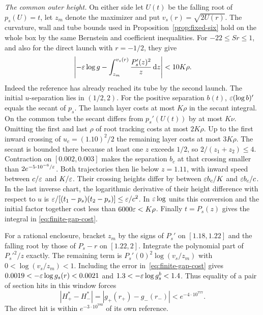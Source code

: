\emph{The common outer height.}
On either side let $U(t)$ be the falling root of $p_s(U)=t$, let
$z_m$ denote the maximizer and put $v_s(r)=\sqrt{2U(r)}$.
The curvature, wall and tube bounds used in
Proposition~\ref{prop:fixed-six} hold on the whole box by the same
Bernstein and coefficient inequalities. For $-22\le Sr\le1$,
and also for the direct launch with $r=-1/2$, they give
\begin{equation}\label{eq:finite-gap-cost}
 \left|-\varepsilon\log g-
   \int_{z_m}^{v_s(r)}\frac{P_s'(z)^2}{z}\,\mathrm{d} z\right|<10K\rho .
\end{equation}
Indeed the reference has already reached its tube by the second launch.
The initial $u$-separation lies in $(1/2,2)$. For the positive
separation $b(t)$, $\varepsilon(\log b)'$ equals the secant of $p_s$.
The launch layer costs at most $K\rho$ in the secant integral.
On the common tube the secant differs from $p_s'(U(t))$ by at most
$K\nu$. Omitting the first and last $\rho$ of root tracking costs at most
$2K\rho$. Up to the first inward crossing of $u_c=(1.10)^2/2$ the
remaining layer costs at most $3K\rho$. The secant is bounded there
because at least one $z$ exceeds $1/2$, so $2/(z_1+z_2)\le4$.
Contraction on $[0.002,0.003]$ makes the separation $b_c$ at that
crossing smaller than $2e^{-5\cdot10^{-6}/\varepsilon}$. Both trajectories
then lie below $z=1.11$, with inward speed between $c/\varepsilon$ and
$K/\varepsilon$. Their crossing heights differ by between
$\varepsilon b_c/K$ and $\varepsilon b_c/c$. In the last inverse chart,
the logarithmic derivative of their height difference with respect to $u$
is $\varepsilon/[(t_1-p_s)(t_2-p_s)]\le\varepsilon/c^2$. In $\varepsilon\log$
units this conversion and the initial factor together cost less than
$6000\varepsilon<K\rho$. Finally $t=P_s(z)$ gives the integral in
\eqref{eq:finite-gap-cost}.

For a rational enclosure, bracket $z_m$ by the signs of $P_s'$ on
$[1.18,1.22]$ and the falling root by those of $P_s-r$ on $[1.22,2]$.
Integrate the polynomial part of $P_s'^2/z$ exactly. The remaining
term is $P_s'(0)^2\log(v_s/z_m)$ with $0<\log(v_s/z_m)<1$.
Including the error in~\eqref{eq:finite-gap-cost} gives
$0.0019<-\varepsilon\log g_s(r)<0.0021$ and
$1.3<-\varepsilon\log g_s^b<1.4$. Thus equality of a pair of section
hits in this window forces
\[
 |H_+^*-H_-^*|=|g_+(r_+)-g_-(r_-)|<e^{-4\cdot10^{777}} .
\]
The direct hit is within $e^{-3\cdot10^{780}}$ of its own reference.

